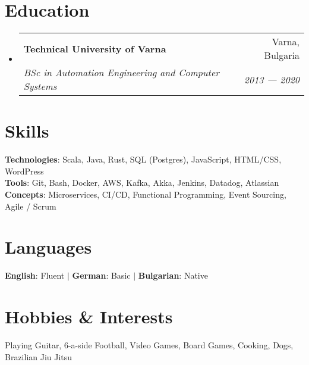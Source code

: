 \documentclass[letterpaper,11pt]{article}
\makeatletter
\newcommand{\resumeSubheading}[4]{
  \vspace{-2pt}\item
    \begin{tabular*}{0.97\textwidth}[t]{l@{\extracolsep{\fill}}r}
      #1 & #2 \\ %
      \textit{\small#3} & \textit{\small #4} \\
    \end{tabular*}\vspace{-7pt}
}
\newcommand{\resumeSubHeadingListStart}{\begin{itemize}[leftmargin=0.15in, label={}]}
\newcommand{\resumeSubHeadingListEnd}{\end{itemize}}
\makeatother
\begin{document}
\section{Education}
  \resumeSubHeadingListStart
    \resumeSubheading
      {\textbf{Technical University of Varna}}{Varna, Bulgaria}
      {BSc in Automation Engineering and Computer Systems}{2013 ---  2020}
  \resumeSubHeadingListEnd


%
\section{Skills}
\begin{itemize}[leftmargin=0.15in, label={}]
  \small{\item{
        \textbf{Technologies}{: Scala, Java, Rust, SQL (Postgres), JavaScript, HTML/CSS, WordPress} \\
        \textbf{Tools}{: Git, Bash, Docker, AWS, Kafka, Akka, Jenkins, Datadog, Atlassian} \\
        \textbf{Concepts}{: Microservices, CI/CD, Functional Programming, Event Sourcing, Agile / Scrum} \\
        }}
\end{itemize}

\section{Languages}
\begin{itemize}[leftmargin=0.15in, label={}]
  \small{\item{
        \textbf{English}{: Fluent} $|$ \textbf{German}{: Basic} $|$ \textbf{Bulgarian}{: Native}
        }}
\end{itemize}

\section{Hobbies \& Interests}
\begin{itemize}[leftmargin=0.15in, label={}]
  \small{\item{Playing Guitar, 6-a-side Football, Video Games, Board Games, Cooking, Dogs, Brazilian Jiu Jitsu}}
\end{itemize}
\end{document}
